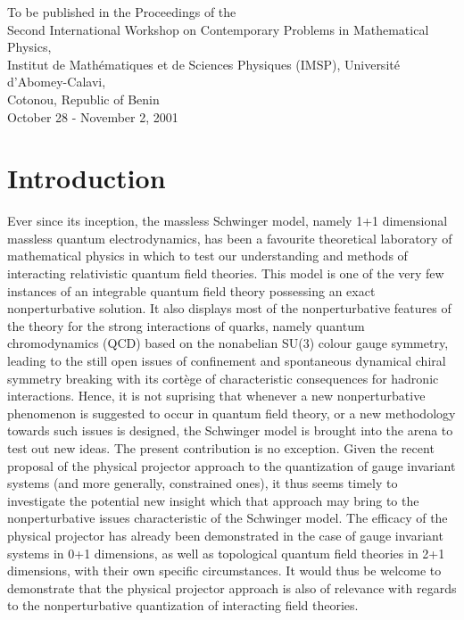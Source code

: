 \documentclass[a4paper,11pt]{article}
\begin{document}
\begin{titlepage}
\begin{centering}
\begin{abstract}
\end{abstract}

\vspace{25pt}
 
To be published in the Proceedings of the\\
Second International Workshop on Contemporary Problems in Mathematical
Physics,\\
Institut de Math\'ematiques et de Sciences Physiques (IMSP), Universit\'e
d'Abomey-Calavi,\\
Cotonou, Republic of Benin\\
October 28\coordHE{} - November 2\coordHE{}, 2001

\end{centering} 

\vspace{100pt}


\end{titlepage}

\section{Introduction}
\label{Sect1}

Ever since its inception,\cite{Schwinger} the massless Schwinger model, namely
1+1 dimensional massless quantum electrodynamics, has been a favourite
theoretical laboratory of mathematical physics in which to test our
understanding and methods of interacting relativistic quantum field theories. 
This model is one of the very few instances of an integrable quantum 
field theory possessing an exact nonperturbative 
solution.\cite{Schwinger,SchM1,Manton,Hetrick} It also displays most of
the nonperturbative features of the theory for the strong interactions
of quarks, namely quantum chromodynamics (QCD) based on the nonabelian
SU(3)\coordHE{} colour gauge symmetry, leading to the still open
issues of confinement and spontaneous dynamical chiral symmetry breaking 
with its cort\`ege of cha\-rac\-te\-ris\-tic consequences for hadronic 
interactions.  Hence, it is not suprising that whenever a new nonperturbative 
phenomenon is suggested to occur in quantum field theory, or a new methodology
towards such issues is designed, the Schwinger model is brought
into the arena to test out new ideas. The present contribution is no exception.
Given the recent proposal\cite{Klauder} of the physical projector approach 
to the quantization of gauge invariant systems (and more generally, 
constrained ones),\cite{Gov1}
it thus seems timely to investigate the potential new insight which that
approach may bring to the nonperturbative issues characteristic of the
Schwinger model. The efficacy of the physical projector has already been
demonstrated in the case of gauge invariant systems in 0+1 
dimensions,\cite{Gov2} as well as topological quantum field theories in 2+1 
dimensions,\cite{Gov3} with their own specific circumstances. It would thus 
be welcome to demonstrate that the physical projector approach is also of 
relevance with regards to the nonperturbative quantization of interacting 
field theories.
\end{document}
